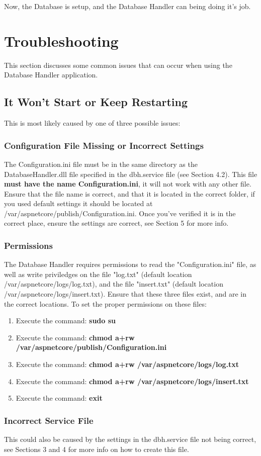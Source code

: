 \documentclass[letterpaper]{article}
\begin{document}
	Now, the Database is setup, and the Database Handler can being doing it's job.
	
	\section{Troubleshooting}
	This section discusses some common issues that can occur when using the Database Handler application.
	
	\subsection{It Won't Start or Keep Restarting}
	This is most likely caused by one of three possible issues:
	
	\subsubsection{Configuration File Missing or Incorrect Settings}
	The Configuration.ini file must be in the same directory as the DatabaseHandler.dll file specified in the dbh.service file (see Section 4.2). This file \textbf{must have the name Configuration.ini}, it will not work with any other file. Ensure that the file name is correct, and that it is located in the correct folder, if you used default settings it should be located at /var/aspnetcore/publish/Configuration.ini. Once you've verified it is in the correct place, ensure the settings are correct, see Section 5 for more info.
	
	\subsubsection{Permissions}
	The Database Handler requires permissions to read the "Configuration.ini" file, as well as write priviledges on the file "log.txt" (default location /var/aspnetcore/logs/log.txt), and the file "insert.txt" (default location /var/aspnetcore/logs/insert.txt). Ensure that these three files exist, and are in the correct locations. To set the proper permissions on these files:
	\begin{enumerate}
		\item Execute the command: \textbf{sudo su}
		\item Execute the command: \textbf{chmod a+rw /var/aspnetcore/publish/Configuration.ini}
		\item Execute the command: \textbf{chmod a+rw /var/aspnetcore/logs/log.txt}
		\item Execute the command: \textbf{chmod a+rw /var/aspnetcore/logs/insert.txt}
		\item Execute the command: \textbf{exit}
	\end{enumerate}
	
	\subsubsection{Incorrect Service File}
	This could also be caused by the settings in the dbh.service file not being correct, see Sections 3 and 4 for more info on how to create this file.
	
\end{document}
